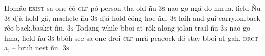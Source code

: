 

\let\\=\textsc
\ex
\begingl[]
Hom\^{a}o     \\{exist}
sa            one
\v{c}\^{o}    \\{clf}
p\^{o}        person
tha           old
\~{n}u        \\{3s}
nao           go
ng\u{a}       do
hmua.         field
\~{N}u        \\{3s}
dj\u{a}       hold
g\u{a},       machete
\~{n}u        \\{3s}
dj\u{a}       hold
\v{c}\u{o}ng  hoe
\~{n}u,       \\{3s}
laih          and
gui           carry.on.back
r\^{e}o       back.basket
\~{n}u.       \\{3s}
Todang        while
bboi          at
r\^{o}k       along
jolan         trail
\~{n}u        \\{3s}
nao           go
hma,          field
\~{n}u        \\{3s}
bb\^{o}h      see
sa            one
droi          \\{clf}
mr\u{a}       peacock
d\u{o}        stay
bboi          at
gah,         \\{drct}
a,           --
hruh         nest
\~{n}u.      \\{3s}
\endilg
\endgl
\xe

\endinput




